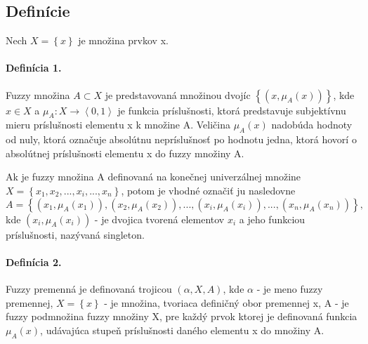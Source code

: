 \subsection{Definície}

Nech $ X = \left\lbrace x \right\rbrace$ je množina prvkov x. 


\paragraph*{Definícia 1.} 
  Fuzzy množina $A \subset X $ je predstavovaná množinou dvojíc $ \left\lbrace \left( x, \mu_A \left( x \right) \right) \right\rbrace  $, kde $ x \in X$ a $ \mu_A : X \longrightarrow \left\langle 0, 1\right\rangle $ je funkcia príslušnosti, ktorá predstavuje subjektívnu mieru príslušnosti elementu x k množine A. 
Veličina $\mu_A\left( x\right) $ nadobúda hodnoty od nuly, ktorá označuje absolútnu nepríslušnosť po hodnotu jedna, ktorá hovorí o absolútnej príslušnosti elementu x do fuzzy množiny A. \cite{Zadeh1965, levashenkoProj}

Ak je fuzzy množina A definovaná na konečnej univerzálnej množine 
\\
 $X = \left\lbrace x_1, x_2, ... , x_i, ..., x_n\right\rbrace $, potom je vhodné označiť ju nasledovne
$$
A = \left\lbrace 
\left( x_1, \mu_A\left( x_1\right)  \right) , 
\left( x_2, \mu_A\left( x_2\right)  \right) , ... , 
\left( x_i, \mu_A\left( x_i\right)  \right) , ... , 
\left( x_n, \mu_A\left( x_n\right)  \right) 
 \right\rbrace , 
$$ 
kde $\left( x_i, \mu_A\left( x_i\right)  \right)$ - je dvojica tvorená elementov $x_i$ a jeho funkciou príslušnosti, nazývaná singleton. \cite{levashenkoProj}


\paragraph*{Definícia 2. }
Fuzzy premenná je definovaná trojicou $\left( \alpha, X, A \right) $, kde 
$\alpha $ - je meno fuzzy premennej, 
 $X=\left\lbrace x \right\rbrace$ - je množina, tvoriaca definičný obor premennej x, 
 A - je fuzzy podmnožina fuzzy množiny X, pre každý prvok ktorej je definovaná funkcia $\mu_A\left( x\right)$, udávajúca stupeň príslušnosti daného elementu x do množiny A.  \cite{levashenkoProj}

